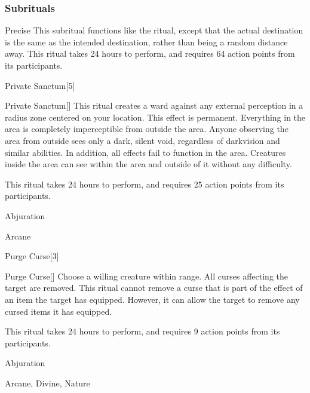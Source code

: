 \subsubsection{Subrituals}


\begin{ability}[\nth{8}]{Precise}
This subritual functions like the  ritual, except that the actual destination is the same as the intended destination, rather than being a random distance away.
This ritual takes 24 hours to perform, and requires 64 action points from its participants.
\end{ability}
\vspace{0.25em}


\begin{spellsection}{Private Sanctum}[5]


\begin{ability}{Private Sanctum}[]
This ritual creates a ward against any external perception in a \arealarge radius zone centered on your location.
This effect is permanent.
Everything in the area is completely imperceptible from outside the area.
Anyone observing the area from outside sees only a dark, silent void, regardless of darkvision and similar abilities.
In addition, all  effects fail to function in the area.
Creatures inside the area can see within the area and outside of it without any difficulty.

This ritual takes 24 hours to perform, and requires 25 action points from its participants.
\end{ability}




 Abjuration

 Arcane
\end{spellsection}


\begin{spellsection}{Purge Curse}[3]


\begin{ability}{Purge Curse}[]
Choose a willing creature within \rngclose range.
All curses affecting the target are removed.
This ritual cannot remove a curse that is part of the effect of an item the target has equipped.
However, it can allow the target to remove any cursed items it has equipped.

This ritual takes 24 hours to perform, and requires 9 action points from its participants.
\end{ability}




 Abjuration

 Arcane, Divine, Nature
\end{spellsection}


